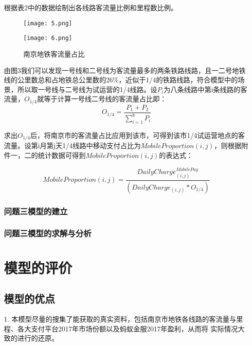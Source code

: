 \documentclass[withoutpreface,bwprint]{cumcmthesis} %
\begin{document}
根据表2中的数据绘制出各线路客流量比例和里程数比例。
\begin{figure}[h]
\centering
\begin{minipage}[c]{0.4\textwidth}
\centering
\texttt{[image: 5.png]}
\end{minipage}
\begin{minipage}[c]{0.4\textwidth}
\centering
\texttt{[image: 6.png]}
\end{minipage}
\caption{南京地铁客流量占比}
\end{figure}

由图3我们可以发现一号线和二号线为客流量最多的两条铁路线路，且一二号地铁线的公里数总和占地铁总公里数的26\%，近似于1/4的铁路线路，符合模型中的场景，所以取一号线与二号线为试运营的1/4线路。设$P_i$为八条线路中第i条线路的客流量，$O_{1/4}$就等于计算一号线二号线的客流量占比即：
\begin{equation}
O_{1/4}=\frac{P_1+P_2}{\sum_{i=1}^{8}P_i}
\end{equation}

求出$O_{1/4}$后，将南京市的客流量占比应用到该市，可得到该市1/4试运营地点的客流量。设第i月第j天1/4线路中移动支付占比为$MobileProportion(i,j)$，则根据附件一，二的统计数据可得到$MobileProportion(i,j)$的表达式：

\begin{equation}
MobileProportion(i,j)=\frac{DailyCharge^{MobilePay}_{(i,j)}}{(DailyCharge_{(i,j)}*O_{1/4})}
\end{equation}

\subsubsection{问题三模型的建立}


\subsubsection{问题三模型的求解与分析}


\section{模型的评价}
\subsection{模型的优点}
1. 本模型尽量的搜集了能获取的真实资料，包括南京市地铁各线路的客流量与里程、各大支付平台2017年市场份额以及蚂蚁金服2017年盈利，从而将
实际情况大致的进行的还原。  
 
\end{document}
